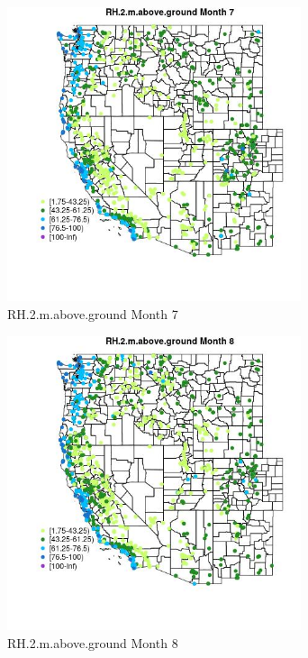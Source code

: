 \begin{figure} 
\centering  
\includegraphics[width=0.77\textwidth]{Code_Outputs/Report_ML_input_PM25_Step4_part_f_de_duplicated_aves_prioritize_24hr_obswNAs_MapObsMo7RH2maboveground.jpg} 
\caption{\label{fig:Report_ML_input_PM25_Step4_part_f_de_duplicated_aves_prioritize_24hr_obswNAsMapObsMo7RH2maboveground}RH.2.m.above.ground Month 7} 
\end{figure} 
 

\begin{figure} 
\centering  
\includegraphics[width=0.77\textwidth]{Code_Outputs/Report_ML_input_PM25_Step4_part_f_de_duplicated_aves_prioritize_24hr_obswNAs_MapObsMo8RH2maboveground.jpg} 
\caption{\label{fig:Report_ML_input_PM25_Step4_part_f_de_duplicated_aves_prioritize_24hr_obswNAsMapObsMo8RH2maboveground}RH.2.m.above.ground Month 8} 
\end{figure} 
 

